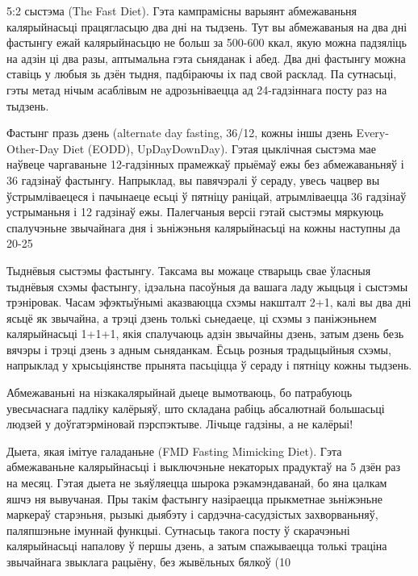 5:2 сыстэма (The Fast Diet).
Гэта кампрамісны варыянт абмежаваньня калярыйнасьці працягласьцю два дні на тыдзень. Тут вы абмежаваныя на два дні фастынгу ежай калярыйнасьцю не больш за 500-600 ккал, якую можна падзяліць на адзін ці два разы, аптымальна гэта сьняданак і абед. Два дні фастынгу можна ставіць у любыя зь дзён тыдня, падбіраючы іх пад свой расклад. Па сутнасьці, гэты метад нічым асаблівым не адрозьніваецца ад 24-гадзіннага посту раз на тыдзень.

Фастынг празь дзень (alternate day fasting, 36/12, кожны іншы дзень Every-Other-Day Diet (EODD), UpDayDownDay).
Гэтая цыклічная сыстэма мае наўвеце чаргаваньне 12-гадзінных прамежкаў прыёмаў ежы без абмежаваньняў і 36 гадзінаў фастынгу. Напрыклад, вы павячэралі ў сераду, увесь чацвер вы ўстрымліваецеся і пачынаеце есьці ў пятніцу раніцай, атрымліваецца 36 гадзінаў устрыманьня і 12 гадзінаў ежы. Палегчаныя версіі гэтай сыстэмы мяркуюць спалучэньне звычайнага дня і зьніжэньня калярыйнасьці на кожны наступны да 20-25%

Тыднёвыя сыстэмы фастынгу.
Таксама вы можаце стварыць свае ўласныя тыднёвыя схэмы фастынгу, ідэальна пасоўныя да вашага ладу жыцьця і сыстэмы трэніровак. Часам эфэктыўнымі аказваюцца схэмы накшталт 2+1, калі вы два дні ясьцё як звычайна, а трэці дзень толькі сьнедаеце, ці схэмы з паніжэньнем калярыйнасьці 1+1+1, якія спалучаюць адзін звычайны дзень, затым дзень безь вячэры і трэці дзень з адным сьняданкам. Ёсьць розныя традыцыйныя схэмы, напрыклад у хрысьціянстве прынята пасьціцца ў сераду і пятніцу кожны тыдзень.

Абмежаваньні на нізкакалярыйнай дыеце вымотваюць, бо патрабуюць увесьчаснага падліку калёрыяў, што складана рабіць абсалютнай большасьці людзей у доўгатэрміновай пэрспэктыве. Лічыце гадзіны, а не калёрыі!

Дыета, якая імітуе галаданьне (FMD Fasting Mimicking Diet).
Гэта абмежаваньне калярыйнасьці і выключэньне некаторых прадуктаў на 5 дзён раз на месяц. Гэтая дыета не зьяўляецца шырока рэкамэндаванай, бо яна цалкам яшчэ ня вывучаная. Пры такім фастынгу назіраецца прыкметнае зьніжэньне маркераў старэньня, рызыкі дыябэту і сардэчна-сасудзістых захворваньняў, паляпшэньне імуннай функцыі. Сутнасьць такога посту ў скарачэньні калярыйнасьці напалову ў першы дзень, а затым спажываецца толькі траціна звычайнага звыклага рацыёну, без жывёльных бялкоў (10%

